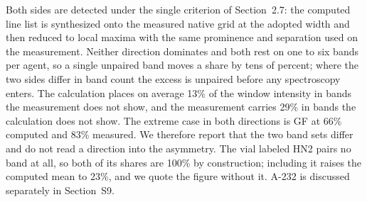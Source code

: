 \begin{table}[htbp]
\centering
\caption{Bands inside the 600--850\,\wn{} window that find no partner in the other library within 35\,\wn{}, expressed as a share of the intensity carried in that window.}
\label{tab:si-unmatched}
\footnotesize
{}

\begin{flushleft}\footnotesize Both sides are detected under the single criterion of Section~2.7: the computed line list is synthesized onto the measured native grid at the adopted width and then reduced to local maxima with the same prominence and separation used on the measurement. Neither direction dominates and both rest on one to six bands per agent, so a single unpaired band moves a share by tens of percent; where the two sides differ in band count the excess is unpaired before any spectroscopy enters. The calculation places on average 13\% of the window intensity in bands the measurement does not show, and the measurement carries 29\% in bands the calculation does not show. The extreme case in both directions is GF at 66\% computed and 83\% measured. We therefore report that the two band sets differ and do not read a direction into the asymmetry. The vial labeled HN2 pairs no band at all, so both of its shares are 100\% by construction; including it raises the computed mean to 23\%, and we quote the figure without it. A-232 is discussed separately in Section~S9.\end{flushleft}
\end{table}
